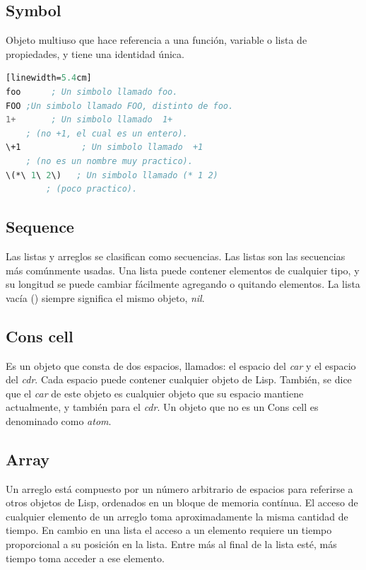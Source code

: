 \documentclass[10pt,journal,compsoc]{IEEEtran}
\begin{document}
\subsection{Symbol}
Objeto multiuso que hace referencia a una funci\'on, variable o lista de propiedades, y tiene una identidad \'unica.

\begin{lstlisting}[language=Lisp, caption = {Ejemplos de s\'imbolos}][linewidth=5.4cm]
foo      ; Un simbolo llamado foo.
FOO ;Un simbolo llamado FOO, distinto de foo.
1+       ; Un simbolo llamado  1+
	; (no +1, el cual es un entero).
\+1            ; Un simbolo llamado  +1
	; (no es un nombre muy practico).
\(*\ 1\ 2\)   ; Un simbolo llamado (* 1 2) 
		; (poco practico).
\end{lstlisting}

\subsection{Sequence}
Las listas y arreglos se clasifican como secuencias. Las listas son las secuencias m\'as com\'unmente usadas. Una lista puede contener elementos de cualquier tipo, y su longitud se puede cambiar f\'acilmente agregando o quitando elementos. La lista vac\'ia () siempre significa el mismo objeto, \emph{nil}.

\subsection{Cons cell}
Es un objeto que consta de dos espacios, llamados: el espacio del \emph{car} y el espacio del \emph{cdr}. Cada espacio puede contener cualquier objeto de Lisp. Tambi\'en, se dice que el \emph{car} de este objeto es cualquier objeto que su espacio mantiene actualmente, y tambi\'en para el \emph{cdr}. Un objeto que no es un Cons cell es denominado como \emph{atom}.

\subsection{Array}
Un arreglo est\'a compuesto por un n\'umero arbitrario de espacios para referirse a otros objetos de Lisp, ordenados en un bloque de memoria cont\'inua. El acceso de cualquier elemento de un arreglo toma aproximadamente la misma cantidad de tiempo. En cambio en una lista el acceso a un elemento requiere un tiempo proporcional a su posici\'on en la lista. Entre m\'as al final de la lista est\'e, m\'as tiempo toma acceder a ese elemento.
\end{document}
